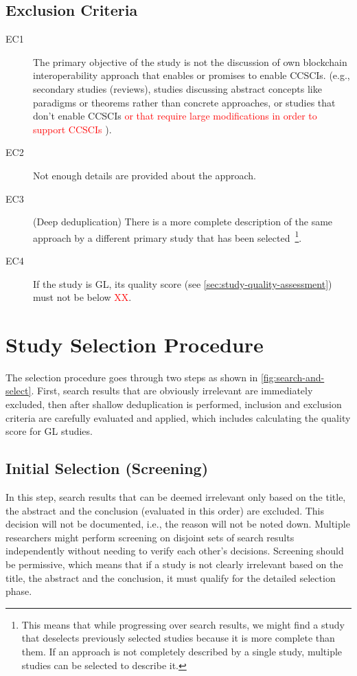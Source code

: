 \documentclass[review]{elsarticle}
\begin{document}
\subsection{Exclusion Criteria}
\begin{description}
	\item[EC1] The primary objective of the study is not the discussion of own blockchain interoperability approach that enables or promises to enable CCSCIs. (e.g., secondary studies (reviews), studies discussing abstract concepts like paradigms or theorems rather than concrete approaches, or studies that don't enable CCSCIs \textcolor{red}{or that require large modifications in order to support CCSCIs} ).
	\item[EC2] Not enough details are provided about the approach.
	\item[EC3] (Deep deduplication) There is a more complete description of the same approach by a different primary study that has been selected~\footnote{This means that while progressing over search results, we might find a study that deselects previously selected studies because it is more complete than them. If an approach is not completely described by a single study, multiple studies can be selected to describe it.}.
	\item[EC4] If the study is GL, its quality score (see \cref{sec:study-quality-assessment}) must not be below \textcolor{red}{XX}.
\end{description}

\section{Study Selection Procedure}
\label{sec:study-selection-procedure}
The selection procedure goes through two steps as shown in \cref{fig:search-and-select}.
First, search results that are obviously irrelevant are immediately excluded, then after shallow deduplication is performed, inclusion and exclusion criteria are carefully evaluated and applied, which includes calculating the quality score for GL studies.

\subsection{Initial Selection (Screening)}
In this step, search results that can be deemed irrelevant only based on the title, the abstract and the conclusion (evaluated in this order) are excluded.
This decision will not be documented, i.e., the reason will not be noted down.
Multiple researchers might perform screening on disjoint sets of search results independently without needing to verify each other's decisions.
Screening should be permissive, which means that if a study is not clearly irrelevant based on the title, the abstract and the conclusion, it must qualify for the detailed selection phase.
\end{document}
